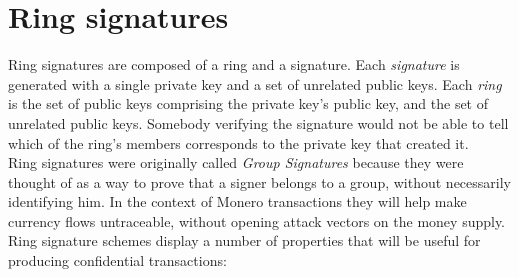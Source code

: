 
\chapter{Ring signatures}
\label{chapter:ring-signatures}


Ring signatures are composed of a ring and a signature. Each {\em signature} is generated with a single private key and a set of unrelated public keys. Each {\em ring} is the set of public keys comprising the private key’s public key, and the set of unrelated public keys. Somebody verifying the signature would not be able to tell which of the ring’s members corresponds to the private key that created it.
\\

Ring signatures were originally called {\em Group Signatures} because they were thought of as a way to prove that a signer belongs to a group, without necessarily identifying him. In the context of Monero transactions they will help make currency flows untraceable, without opening attack vectors on the money supply.
\\

Ring signature schemes display a number of properties that will be useful for producing confidential transactions:

